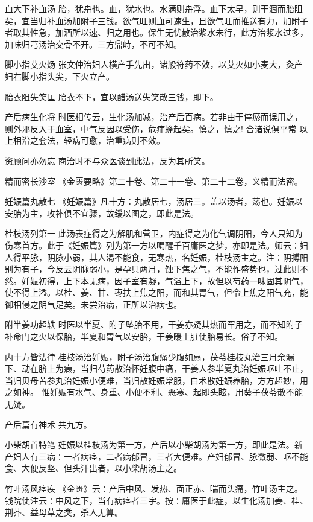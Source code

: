 \documentclass[a4paper,12pt,UTF8,twoside]{ctexbook}
\begin{document}
    血大下补血汤
    胎，犹舟也。血，犹水也。水满则舟浮。血下太早，则干涸而胎阻矣，宜当归补血汤加附子三钱。欲气旺则血可速生，且欲气旺而推送有力，加附子者取其性急，加酒所以速、归之用也。保生无忧散治浆水未行，此方治浆水过多，加味归芎汤治交骨不开。三方鼎峙，不可不知。
    
    脚小指艾火炀
    张文仲治妇人横产手先出，诸般符药不效，以艾火如小麦大，灸产妇右脚小指头尖，下火立产。
    
    胎衣阻失笑匡
    胎衣不下，宜以醋汤送失笑散三钱，即下。
    
    产后病生化将
    时医相传云，生化汤加减，治产后百病。若非由于停瘀而误用之，则外邪反入于血室，中气反因以受伤，危症蜂起矣。慎之，慎之!
    合诸说俱平常
    以上相沿之套法，轻病可愈，治重病则不效。
    
    资顾问亦勿忘
    商治时不与众医谈到此法，反为其所笑。
    
    精而密长沙室
    《金匮要略》第二十卷、第二十一卷、第二十二卷，义精而法密。
    
    妊娠篇丸散七
    《妊娠篇》凡十方∶丸散居七，汤居三。盖以汤者，荡也。妊娠以安胎为主，攻补俱不宜骤，故缓以图之，即此是法。
    
    桂枝汤列第一
    此汤表症得之为解肌和营卫，内症得之为化气调阴阳，今人只知为伤寒首方。此于《妊娠篇》列为第一方以喝醒千百庸医之梦，亦即是法。师云∶妇人得平脉，阴脉小弱，其人渴不能食，无寒热，名妊娠，桂枝汤主之。注∶阴搏阳别为有子，今反云阴脉弱小，是孕只两月，蚀下焦之气，不能作盛势也，过此则不然。妊娠初得，上下本无病，因子室有凝，气溢上下，故但以芍药一味固其阴气，使不得上溢。以桂、姜、甘、枣扶上焦之阳，而和其胃气，但令上焦之阳气充，能御相侵之阴气足矣。未尝治病，正所以治病也。
    
    附半姜功超轶
    时医以半夏、附子坠胎不用，干姜亦疑其热而罕用之，而不知附子补命门之火以保胎，半夏和胃气以安胎，干姜暖土脏使胎易长。俗子不知。
    
    内十方皆法律
    桂枝汤治妊娠，附子汤治腹痛少腹如扇，茯苓桂枝丸治三月余漏下、动在脐上为瘕，当归芍药散治怀妊腹中痛，干姜人参半夏丸治妊娠呕吐不止，当归贝母苦参丸治妊娠小便难，当归散妊娠常服，白术散妊娠养胎，方方超妙，用之如神。
    惟妊娠有水气、身重、小便不利、恶寒、起即头眩，用葵子茯苓散不能无疑。
    
    产后篇有神术
    共九方。
    
    小柴胡首特笔
    妊娠以桂枝汤为第一方，产后以小柴胡汤为第一方，即此是法。新产妇人有三病∶一者病痉，二者病郁冒，三者大便难。产妇郁冒、脉微弱、呕不能食、大便反坚、但头汗出者，以小柴胡汤主之。
    
    竹叶汤风痉疾
    《金匮》云∶产后中风、发热、面正赤、喘而头痛，竹叶汤主之。钱院使注云∶中风之下，当有病痉者三字。按∶庸医于此症，以生化汤加姜、桂、荆芥、益母草之类，杀人无算。
    
\end{document}
